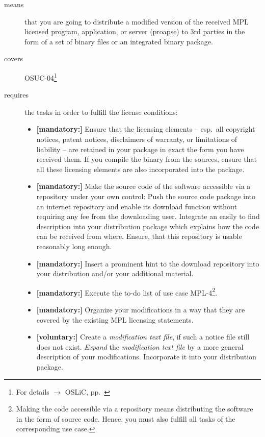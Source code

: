 \begin{description}
\item[means] that you are going to distribute a modified version of the received
MPL licensed pro\-gram, application, or server (proapse) to 3rd parties in
the form of a set of binary files or an integrated binary package.
\item[covers] OSUC-04\footnote{For details $\rightarrow$ OSLiC, pp.\ \pageref{OSUC-04-DEF}}
\item[requires] the tasks in order to fulfill the license conditions:
\begin{itemize}

  \item \textbf{[mandatory:]} Ensure that the licensing elements -- esp.\ all
  copyright notices, patent notices, disclaimers of warranty, or limitations of
  liability -- are retained in your package in exact the form you have received
  them. If you compile the binary from the sources, ensure that all these
  licensing elements are also incorporated into the package.

  \item \textbf{[mandatory:]} Make the source code of the software accessible
  via a repository under your own control: Push the source code package into an
  internet repository and enable its download function without requiring any fee
  from the downloading user. Integrate an easily to find description into your
  distribution package which explains how the code can be received from where.
  Ensure, that this repository is usable reasonably long enough.
  
  \item \textbf{[mandatory:]} Insert a prominent hint to the download repository
  into your distribution and/or your additional material. 

  \item \textbf{[mandatory:]} Execute the to-do list of use case MPL-4\footnote{
  Making the code accessible via a repository means distributing the software in
  the form of source code. Hence, you must also fulfill all tasks of the
  corresponding use case.}.

  \item \textbf{[mandatory:]} Organize your modifications in a way that they are
  covered by the existing MPL licensing statements.
  
  \item \textbf{[voluntary:]} Create a \emph{modification text file}, if such a
  notice file still does not exist. \emph{Expand} the \emph{modification text
  file} by a more general description of your modifications. Incorporate it into
  your distribution package.
  

\end{itemize}
\end{description}
